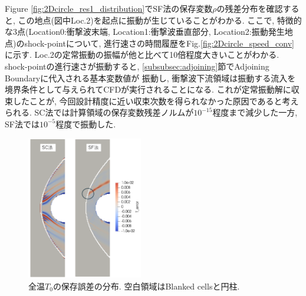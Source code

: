 \documentclass[a4j]{jarticle}
\begin{document}
Figure \ref{fig:2Dcircle_res1_distribution}でSF法の保存変数$\rho$の残差分布を確認すると, この地点(図中Loc.2)を起点に振動が生じていることがわかる.
ここで, 特徴的な3点(Location0:衝撃波末端, Location1:衝撃波垂直部分, Location2:振動発生地点)のshock-pointについて,
進行速さの時間履歴をFig.\ref{fig:2Dcircle_speed_conv}に示す.
Loc.2の定常振動の振幅が他と比べて10倍程度大きいことがわかる. 
shock-pointの進行速さが振動すると, \ref{subsubsec:adjoining}節でAdjoining Boundaryに代入される基本変数値が
振動し, 衝撃波下流領域は振動する流入を境界条件として与えられてCFDが実行されることになる.
これが定常振動解に収束したことが, 今回設計精度に近い収束次数を得られなかった原因であると考えられる.
SC法では計算領域の保存変数残差ノルムが$10^{-15}$程度まで減少した一方, 
SF法では$10^{-5}$程度で振動した.

\begin{figure}[h]
    \begin{center}
        \includegraphics[width=0.45\textwidth]{t_error_distribution.pdf}
    \end{center}
    \caption{全温$T_0$の保存誤差の分布. 空白領域はBlanked cellsと円柱.}
    \label{fig:2Dcircle_t_error_distribution}
\end{figure}
\end{document}
